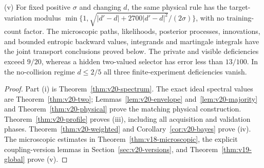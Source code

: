 \begin{theorem}
\smallskip\noindent
\textup{(v)} For fixed positive $\sigma$ and changing $d$, the same
physical rule has the target-variation modulus
$\min\{1,\sqrt{|d'-d|+2700|d'-d|^2}/(2\sigma)\}$, with no training-count
factor. The microscopic paths, likelihoods, posterior processes,
innovations, and bounded entropic backward values, integrands and
martingale integrals have the joint transport conclusions proved below.
The private and visible deficiencies exceed $9/20$, whereas a hidden
two-valued selector has error less than $13/100$. In the no-collision
regime $d\le2/5$ all three finite-experiment deficiencies vanish.
\end{theorem}
\begin{proof}
Part (i) is Theorem~\ref{thm:v20-spectrum}. The exact ideal spectral
values are Theorem~\ref{thm:v20-two}; Lemmas~\ref{lem:v20-envelope}
and~\ref{lem:v20-majority} and Theorem~\ref{thm:v20-physical} prove
the matching physical construction. Theorem~\ref{thm:v20-profile}
proves (iii), including all acquisition and validation phases.
Theorem~\ref{thm:v20-weighted} and Corollary~\ref{cor:v20-bayes}
prove (iv). The microscopic estimates in
Theorem~\ref{thm:v18-microscopic}, the explicit coupling-version lemmas
in Section~\ref{sec:v20-versions}, and
Theorem~\ref{thm:v19-global} prove (v).
\end{proof}

